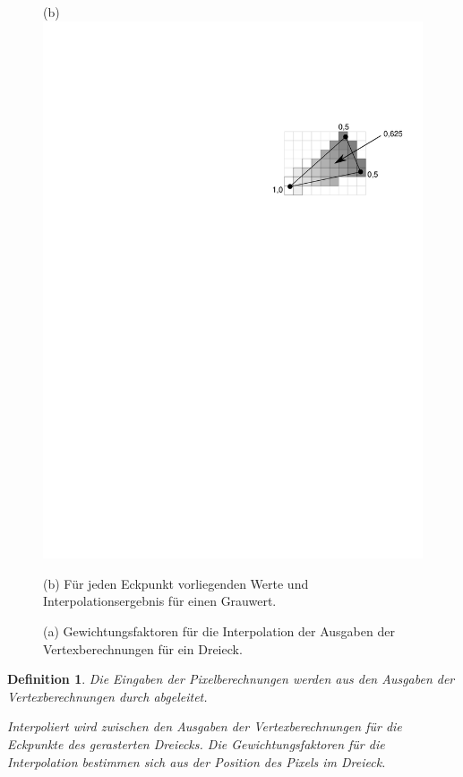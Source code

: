 \documentclass[twoside,a4paper,fleqn,12pt]{book}
\newtheorem{defn}{Definition}
\begin{document}
\begin{figure}[h]
  (b) \includegraphics[scale=0.8]{triraster_values}
  \caption{(a) Gewichtungsfaktoren für die Interpolation der Ausgaben der Vertexberechnungen für ein Dreieck.}
  \small (b) Für jeden Eckpunkt vorliegenden Werte und Interpolationsergebnis für einen Grauwert.
  \label{fig:triraster_lerp}
\end{figure}


\begin{defn}
Die Eingaben der Pixelberechnungen werden aus den Ausgaben der Vertexberechnungen durch 
abgeleitet.

Interpoliert wird zwischen den Ausgaben der Vertexberechnungen für die Eckpunkte des gerasterten Dreiecks.
Die Gewichtungsfaktoren für die Interpolation bestimmen sich aus der Position des Pixels im Dreieck.
\end{defn}
\end{document}
